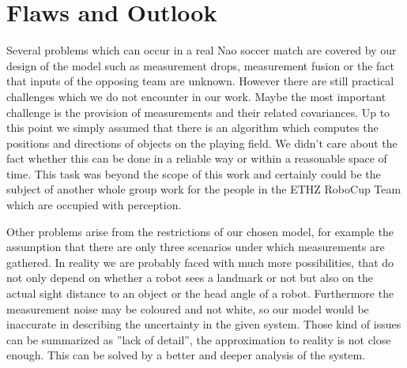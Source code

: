 
\chapter{Flaws and Outlook}

Several problems which can occur in a real Nao soccer match are covered by our design of the model such as measurement drops, measurement fusion or the fact that inputs of the opposing team are unknown. However there are still practical challenges which we do not encounter in our work. Maybe the most important challenge is the provision of measurements and their related covariances. Up to this point we simply assumed that there is an algorithm which computes the positions and directions of objects on the playing field. We didn't care about the fact whether this can be done in a reliable way or within a reasonable space of time. This task was beyond the scope of this work and certainly could be the subject of another whole group work for the people in the ETHZ RoboCup Team which are occupied with perception.
\parskip 0pt

Other problems arise from the restrictions of our chosen model, for example the assumption that there are only three scenarios under which measurements are gathered. In reality we are probably faced with much more possibilities, that do not only depend on whether a robot sees a landmark or not but also on the actual sight distance to an object or the head angle of a robot. Furthermore the measurement noise may be coloured and not white, so our model would be inaccurate in describing the uncertainty in the given system. Those kind of issues can be summarized as ''lack of detail'', the approximation to reality is not close enough. This can be solved by a better and deeper analysis of the system.

